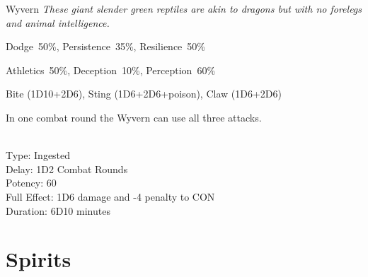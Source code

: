 \newpage

\begin{monsterbox}{Wyvern}
	\textit{These giant slender green reptiles are akin to dragons but with no forelegs and animal intelligence.}\\
	\rpghline
	\basics[%
        hitpoints  = 23, 
	majorwound = 12,
	damagemodifier = +2D6,
	powerpoints = 10,
	movementrate = {23m, 30m when flying},
	armor = Scales (5AP),
	plunderrating = 1
	]
	\rpghline%
	\stats[ %
		STR = 4D6+12 (26),
		CON = 2D6+12 (19),
		DEX = 2D6+6  (13),
		SIZ = 4D6+12 (26),
		INT = 7      (7),
		POW = 3D6    (11),
		CHA = 6      (6)
	]
	\rpghline%
	\begin{rpg-monsteraction}[Resistances]
		Dodge~50\%, Persistence~35\%, Resilience~50\%
	\end{rpg-monsteraction}
	\begin{rpg-monsteraction}[Practical]
		Athletics~50\%, Deception~10\%, Perception~60\%
	\end{rpg-monsteraction}
	\begin{rpg-monsteraction}
		Bite (1D10+2D6), Sting (1D6+2D6+poison), Claw (1D6+2D6)
	\end{rpg-monsteraction}
	\begin{rpg-monsteraction}
		In one combat round the Wyvern can use all three attacks.	
	\end{rpg-monsteraction}
	\begin{rpg-monsteraction}
		\\Type: Ingested\\
		Delay: 1D2 Combat Rounds\\
                Potency: 60\\
		Full Effect: 1D6 damage and -4 penalty to CON\\
		Duration: 6D10 minutes
	\end{rpg-monsteraction}

\end{monsterbox}

\clearpage

\section{Spirits}
\label{sec:spirits}

